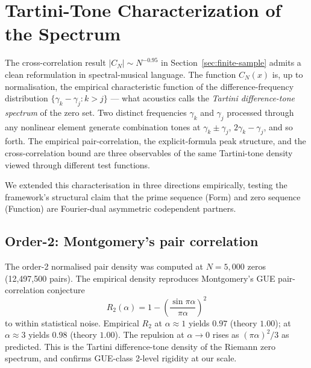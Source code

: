 \documentclass[11pt,a4paper]{article}
\theoremstyle{plain}
\theoremstyle{definition}
\theoremstyle{remark}
\begin{document}

\section{Tartini-Tone Characterization of the Spectrum}
\label{sec:tartini}

The cross-correlation result $|C_N| \sim N^{-0.95}$ in
Section~\ref{sec:finite-sample} admits a clean reformulation in
spectral-musical language. The function $C_N(x)$ is, up to
normalisation, the empirical characteristic function of the
difference-frequency distribution $\{\gamma_k - \gamma_j : k > j\}$
--- what acoustics calls the \emph{Tartini difference-tone spectrum}
of the zero set. Two distinct frequencies $\gamma_k$ and $\gamma_j$
processed through any nonlinear element generate combination tones
at $\gamma_k \pm \gamma_j$, $2\gamma_k - \gamma_j$, and so forth.
The empirical pair-correlation, the explicit-formula peak structure,
and the cross-correlation bound are three observables of the same
Tartini-tone density viewed through different test functions.

We extended this characterisation in three directions empirically,
testing the framework's structural claim that the prime sequence
(Form) and zero sequence (Function) are Fourier-dual asymmetric
codependent partners.

\subsection{Order-2: Montgomery's pair correlation}
\label{sec:tartini-r2}

The order-2 normalised pair density was computed at $N = 5{,}000$
zeros (12{,}497{,}500 pairs). The empirical density reproduces
Montgomery's GUE pair-correlation conjecture
\begin{equation}
  R_2(\alpha) = 1 - \left(\frac{\sin \pi\alpha}{\pi\alpha}\right)^2
  \label{eq:R2}
\end{equation}
to within statistical noise. Empirical $R_2$ at $\alpha \approx 1$
yields $0.97$ (theory $1.00$); at $\alpha \approx 3$ yields $0.98$
(theory $1.00$). The repulsion at $\alpha \to 0$ rises as $(\pi\alpha)^2/3$
as predicted. This is the Tartini difference-tone density of the
Riemann zero spectrum, and confirms GUE-class 2-level rigidity at
our scale.
\end{document}
